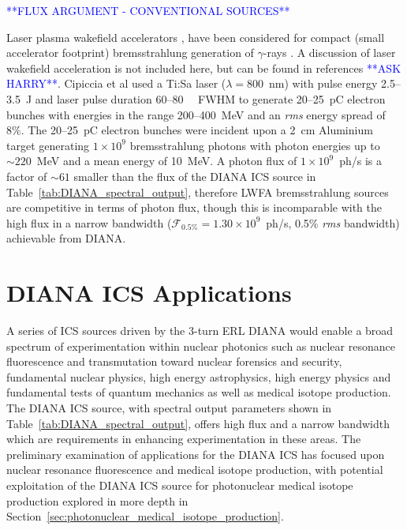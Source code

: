 \documentclass[../main.tex]{subfiles}
\begin{document}
\textcolor{blue}{**FLUX ARGUMENT - CONVENTIONAL SOURCES**}

Laser plasma wakefield accelerators \cite{sprangle1988laser}, have been considered for compact (small accelerator footprint) bremsstrahlung generation of $\gamma$-rays \cite{cipiccia2012tuneable,lemos2018bremsstrahlung}. A discussion of laser wakefield acceleration is not included here, but can be found in references \textcolor{blue}{**ASK HARRY**}. Cipiccia et al used a Ti:Sa laser ($\lambda = 800$~\si{\nano\meter}) with pulse energy 2.5--3.5~\si{\joule} and laser pulse duration 60--80~\si{\femto\seconds} FWHM to generate 20--25~\si{\pico\coulomb} electron bunches with energies in the range 200--400~\si{\mega\electronvolt} and an \textit{rms} energy spread of 8\%. The 20--25~\si{\pico\coulomb} electron bunches were incident upon a 2~\si{\centi\meter} Aluminium target generating $1\times 10^{9}$ bremsstrahlung photons with photon energies up to $\sim 220$~\si{\mega\electronvolt} and a mean energy of 10~\si{\mega\electronvolt}. A photon flux of $1\times 10^{9}$~ph/\si{\second} is a factor of $\sim 61$ smaller than the flux of the DIANA ICS source in Table~\ref{tab:DIANA_spectral_output}, therefore LWFA bremsstrahlung sources are competitive in terms of photon flux, though this is incomparable with the high flux in a narrow bandwidth ($\mathcal{F}_{\mathrm{0.5\%}} = 1.30\times 10^{9}$~ph/\si{\second}, 0.5\% \textit{rms} bandwidth) achievable from DIANA.    

\section{DIANA ICS Applications}

A series of ICS sources driven by the 3-turn ERL DIANA would enable a broad spectrum of experimentation within nuclear photonics \cite{nedorezov2017nuclear,budker2021expanding} such as nuclear resonance fluorescence and transmutation toward nuclear forensics and security, fundamental nuclear physics, high energy astrophysics, high energy physics and fundamental tests of quantum mechanics as well as medical isotope production. The DIANA ICS source, with spectral output parameters shown in Table~\ref{tab:DIANA_spectral_output}, offers high flux and a narrow bandwidth which are requirements in enhancing experimentation in these areas. The preliminary examination of applications for the DIANA ICS has focused upon nuclear resonance fluorescence and medical isotope production, with potential exploitation of the DIANA ICS source for photonuclear medical isotope production explored in more depth in Section~\ref{sec:photonuclear_medical_isotope_production}.  
\end{document}
